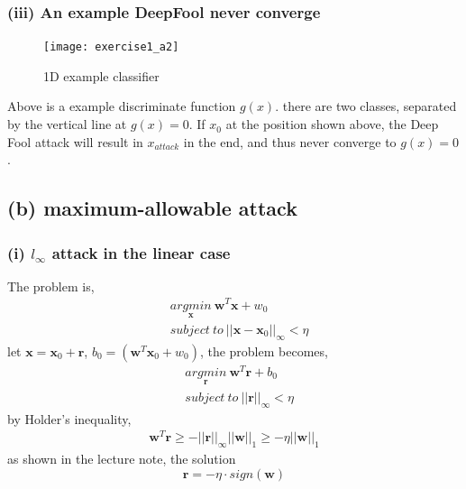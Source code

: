 \documentclass[11pt]{article}
\begin{document}
\subsubsection*{(iii) An example DeepFool never converge}
\begin{figure}[h]
	\centering
	\texttt{[image: exercise1\_a2]}
	\caption{1D example classifier}
\end{figure}
Above is a example discriminate function $g(x)$. there are two classes, separated by the vertical line at $g(x)=0$. If $x_0$ at the position shown above, the Deep Fool attack will result in $x_{attack}$ in the end, and thus never converge to $g(x)=0$.
\subsection*{(b) maximum-allowable attack}
\subsubsection*{(i) $l_\infty$ attack in the linear case}
The problem is,
\begin{equation}
\begin{split}
&\underset{\pmb{x}}{argmin}\ \pmb{w}^T\pmb{x}+w_0\\
&subject\ to\ ||\pmb{x}-\pmb{x}_0||_\infty<\eta
\end{split}
\end{equation}
let $\pmb{x}=\pmb{x}_0+\pmb{r}$, $b_0=(\pmb{w}^T\pmb{x}_0+w_0)$, the problem becomes,
\begin{equation}
\begin{split}
&\underset{\pmb{r}}{argmin}\ \pmb{w}^T\pmb{r}+b_0\\
&subject\ to\ ||\pmb{r}||_\infty<\eta
\end{split}
\end{equation}
by Holder's inequality,
\begin{equation}
\begin{split}
\pmb{w}^T\pmb{r} \ge -||\pmb{r}||_\infty||\pmb{w}||_1\ge-\eta||\pmb{w}||_1
\end{split}
\end{equation}
as shown in the lecture note, the solution 
\begin{equation}
\pmb{r} = -\eta\cdot sign(\pmb{w})
\end{equation}
\end{document}
